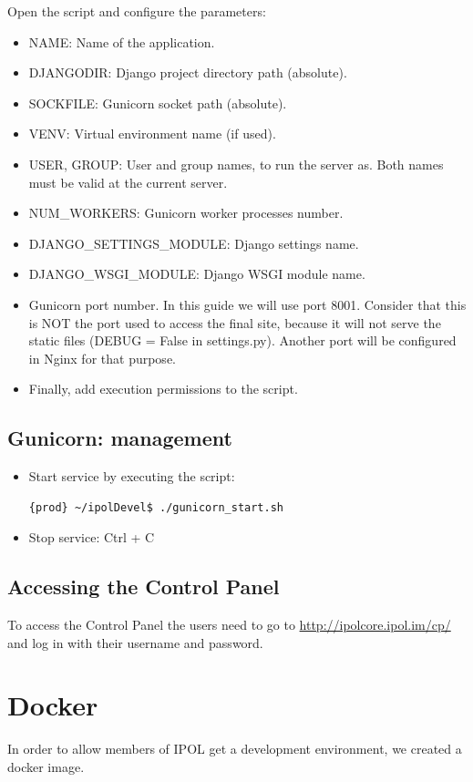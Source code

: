 \documentclass[a4paper,12pt]{article}
\begin{document}
Open the script and configure the parameters:
\begin{itemize}
    \item NAME: Name of the application.
    \item DJANGODIR: Django project directory path (absolute).
    \item SOCKFILE: Gunicorn socket path (absolute).
    \item VENV: Virtual environment name (if used).
    \item USER, GROUP: User and group names, to run the server as. Both names must be valid at the current server.
    \item NUM\_WORKERS: Gunicorn worker processes number.
    \item DJANGO\_SETTINGS\_MODULE: Django settings name.
    \item DJANGO\_WSGI\_MODULE: Django WSGI module name.
    \item Gunicorn port number. In this guide we will use port 8001. Consider that this is NOT the port used to access the final site, because it will not serve the static files (DEBUG = False in settings.py). Another port will be configured in Nginx for that purpose.
    \item Finally, add execution permissions to the script.
\end{itemize}

\subsection{Gunicorn: management}
\begin{itemize}
    \item Start service by executing the script:
    \begin{lstlisting}[language=Bash]
    {prod} ~/ipolDevel$ ./gunicorn_start.sh
    \end{lstlisting}

    \item Stop service: Ctrl + C
\end{itemize}



\subsection{Accessing the Control Panel}
To access the Control Panel the users need to go to \url{http://ipolcore.ipol.im/cp/} and log in with their username and password.

\section{Docker}
In order to allow members of IPOL get a development environment, we created a docker image.
\end{document}
